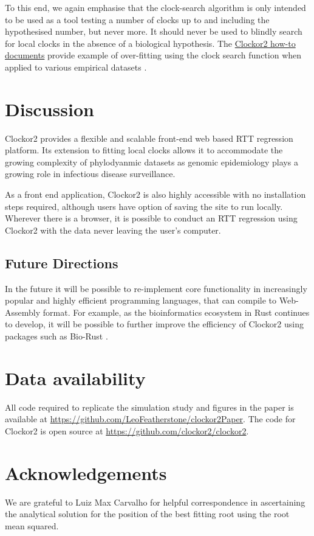 \documentclass{article}
\begin{document}
To this end, we again emphasise that the clock-search algorithm is only intended to be used as a tool testing a number of clocks up to and including the hypothesised number, but never more. It should never be used to blindly search for local clocks in the absence of a biological hypothesis. The \href{https://clockor2.github.io/clockor2/}{Clockor2 how-to documents} provide example of over-fitting using the clock search function when applied to various empirical datasets \citep{porter2023evolutionary,dudas_mers-cov_2018}.

\section*{Discussion}
Clockor2 provides a flexible and scalable front-end web based RTT regression platform. Its extension to fitting local clocks allows it to accommodate the growing complexity of phylodyanmic datasets as genomic epidemiology plays a growing role in infectious disease surveillance. 

As a front end application, Clockor2 is also highly accessible with no installation steps required, although users have option of saving the site to run locally. Wherever there is a browser, it is possible to conduct an RTT regression using Clockor2 with the data never leaving the user's computer.

\subsection*{Future Directions}
In the future it will be possible to re-implement core functionality in increasingly popular and highly efficient programming languages, that can compile to Web-Assembly format. For example, as the bioinformatics ecosystem in Rust continues to develop, it will be possible to further improve the efficiency of Clockor2 using packages such as Bio-Rust \citep{koester_rust-bio-2015}.


\section*{Data availability}
All code required to replicate the simulation study and figures in the paper is available at \url{https://github.com/LeoFeatherstone/clockor2Paper}. The code for Clockor2 is open source at \url{https://github.com/clockor2/clockor2}.

\section*{Acknowledgements}
We are grateful to Luiz Max Carvalho for helpful correspondence in ascertaining the analytical solution for the position of the best fitting root using the root mean squared.


\end{document}
